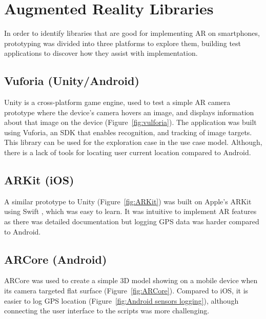 
{
\section{Augmented Reality Libraries}
In order to identify libraries that are good for implementing AR on smartphones, prototyping was divided into three platforms to explore them, building test applications to discover how they assist with implementation.

\subsection*{Vuforia (Unity/Android)}
Unity is a cross-platform game engine, used to test a simple AR camera prototype where the device's camera hovers an image, and displays information about that image on the device (Figure~\ref{fig:vulforia}). The application was built using Vuforia, an SDK that enables recognition, and tracking of image targets. This library can be used for the exploration case in the use case model. Although, there is a lack of tools for locating user current location compared to Android.

\subsection*{ARKit (iOS)}
A similar prototype to Unity (Figure~\ref{fig:ARKit}) was built on Apple's ARKit using Swift \cite{applear}, which was easy to learn. It was intuitive to implement AR features as there was detailed documentation but logging GPS data was harder compared to Android.

\subsection*{ARCore (Android)}
ARCore was used to create a simple 3D model showing on a mobile device when its camera targeted flat surface (Figure~\ref{fig:ARCore}). Compared to iOS, it is easier to log GPS location (Figure~\ref{fig:Android sensors logging}), although connecting the user interface to the scripts was more challenging.

}
